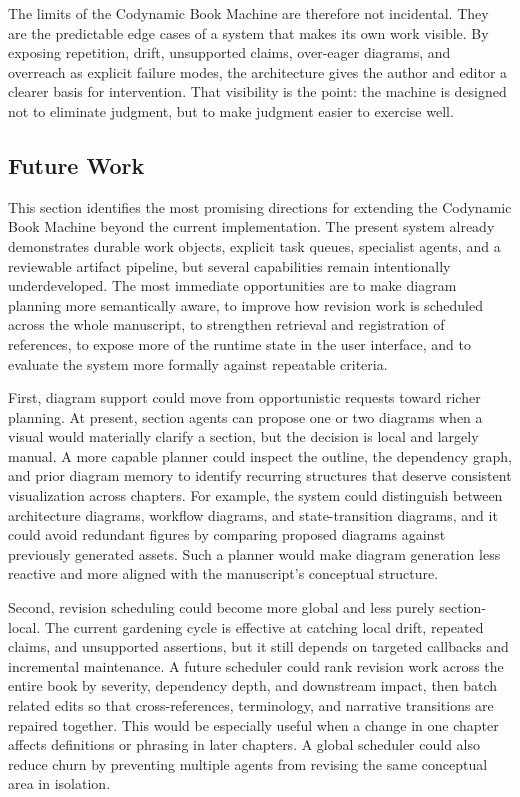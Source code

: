 \documentclass[11pt]{article}
\begin{document}
The limits of the Codynamic Book Machine are therefore not incidental. They are the predictable edge cases of a system that makes its own work visible. By exposing repetition, drift, unsupported claims, over-eager diagrams, and overreach as explicit failure modes, the architecture gives the author and editor a clearer basis for intervention. That visibility is the point: the machine is designed not to eliminate judgment, but to make judgment easier to exercise well.



\subsection{Future Work}


This section identifies the most promising directions for extending the Codynamic Book Machine beyond the current implementation. The present system already demonstrates durable work objects, explicit task queues, specialist agents, and a reviewable artifact pipeline, but several capabilities remain intentionally underdeveloped. The most immediate opportunities are to make diagram planning more semantically aware, to improve how revision work is scheduled across the whole manuscript, to strengthen retrieval and registration of references, to expose more of the runtime state in the user interface, and to evaluate the system more formally against repeatable criteria.

First, diagram support could move from opportunistic requests toward richer planning. At present, section agents can propose one or two diagrams when a visual would materially clarify a section, but the decision is local and largely manual. A more capable planner could inspect the outline, the dependency graph, and prior diagram memory to identify recurring structures that deserve consistent visualization across chapters. For example, the system could distinguish between architecture diagrams, workflow diagrams, and state-transition diagrams, and it could avoid redundant figures by comparing proposed diagrams against previously generated assets. Such a planner would make diagram generation less reactive and more aligned with the manuscript's conceptual structure.

Second, revision scheduling could become more global and less purely section-local. The current gardening cycle is effective at catching local drift, repeated claims, and unsupported assertions, but it still depends on targeted callbacks and incremental maintenance. A future scheduler could rank revision work across the entire book by severity, dependency depth, and downstream impact, then batch related edits so that cross-references, terminology, and narrative transitions are repaired together. This would be especially useful when a change in one chapter affects definitions or phrasing in later chapters. A global scheduler could also reduce churn by preventing multiple agents from revising the same conceptual area in isolation.
\end{document}
